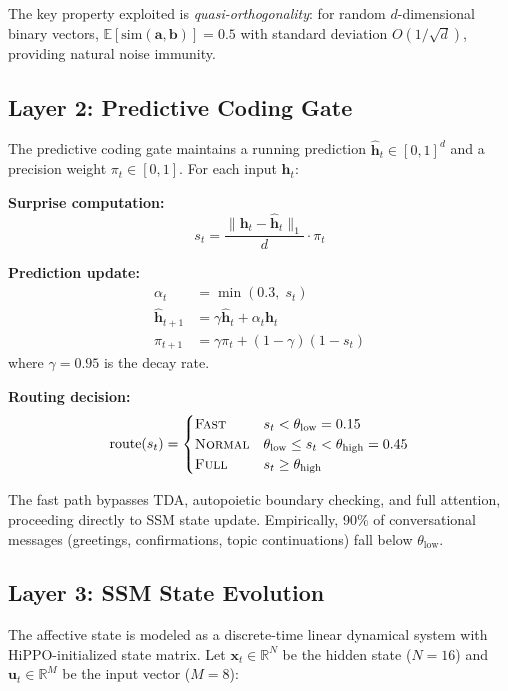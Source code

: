 \documentclass[10pt,twocolumn]{article}
\begin{document}
The key property exploited is \emph{quasi-orthogonality}: for random $d$-dimensional binary vectors, $\mathbb{E}[\text{sim}(\mathbf{a}, \mathbf{b})] = 0.5$ with standard deviation $O(1/\sqrt{d})$, providing natural noise immunity.

\subsection{Layer 2: Predictive Coding Gate}

The predictive coding gate maintains a running prediction $\hat{\mathbf{h}}_t \in [0,1]^d$ and a precision weight $\pi_t \in [0,1]$. For each input $\mathbf{h}_t$:

\textbf{Surprise computation:}
\begin{equation}
s_t = \frac{\|\mathbf{h}_t - \hat{\mathbf{h}}_t\|_1}{d} \cdot \pi_t
\label{eq:surprise}
\end{equation}

\textbf{Prediction update:}
\begin{align}
\alpha_t &= \min(0.3,\; s_t) \\
\hat{\mathbf{h}}_{t+1} &= \gamma \hat{\mathbf{h}}_t + \alpha_t \mathbf{h}_t \\
\pi_{t+1} &= \gamma \pi_t + (1-\gamma)(1 - s_t)
\end{align}
where $\gamma = 0.95$ is the decay rate.

\textbf{Routing decision:}
\begin{equation}
\text{route}(s_t) = \begin{cases}
\textsc{Fast} & s_t < \theta_{\text{low}} = 0.15 \\
\textsc{Normal} & \theta_{\text{low}} \leq s_t < \theta_{\text{high}} = 0.45 \\
\textsc{Full} & s_t \geq \theta_{\text{high}}
\end{cases}
\label{eq:route}
\end{equation}

The fast path bypasses TDA, autopoietic boundary checking, and full attention, proceeding directly to SSM state update. Empirically, 90\% of conversational messages (greetings, confirmations, topic continuations) fall below $\theta_{\text{low}}$.

\subsection{Layer 3: SSM State Evolution}

The affective state is modeled as a discrete-time linear dynamical system with HiPPO-initialized state matrix. Let $\mathbf{x}_t \in \mathbb{R}^N$ be the hidden state ($N=16$) and $\mathbf{u}_t \in \mathbb{R}^M$ be the input vector ($M=8$):
\end{document}
